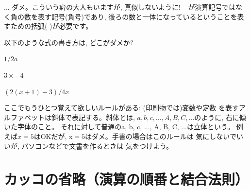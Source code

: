\begin{freqmiss}{\small{}
... ダメ。こういう癖の大人もいますが, 真似しないように! 
$-$が演算記号ではなく負の数を表す記号(負号)であり, 
後ろの数と一体になっているということを表すための括弧( )が必要です。}\end{freqmiss}

\begin{q}\label{q:bad_notation0} 以下のような式の書き方は, どこがダメか?
\begin{edaenumerate}
\item $1/2a$
\item $3\times-4$
\item $(2(x+1)-3)/4x$
\end{edaenumerate}
\end{q}

ここでもうひとつ覚えて欲しいルールがある: (印刷物では)変数や定数
を表すアルファベットは斜体で表記する。斜体とは, 
$a, b, c, ..., A, B, C, ...$のように, 右に傾いた字体のこと。
それに対して普通のa, b, c, ..., A, B, C, ...は立体という。
例えば$x=5$はOKだが, x$=5$はダメ。手書の場合はこのルールは
気にしないでいいが, パソコンなどで文書を作るときは
気をつけよう。\\


\section{カッコの省略（演算の順番と結合法則）}


